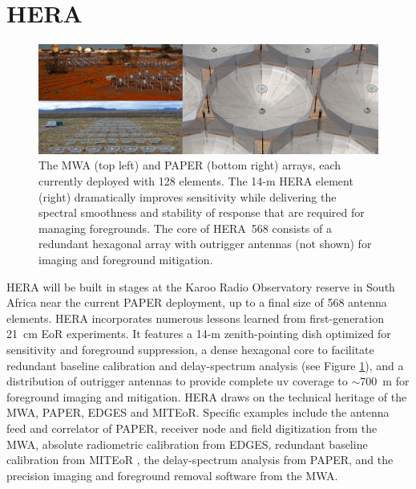 \documentclass[preprint]{aastex}
\begin{document}
\vspace{-0.25in}
\section{HERA}
\label{PDsec}
\begin{figure}[t]\centering
\includegraphics[width=6.5in]{plots/PAPER_and_MWA_and_HERA.jpg}
\caption{\small
The MWA (top left) and PAPER (bottom right) arrays, each currently deployed with 128 elements.
The 14-m HERA element (right) dramatically improves sensitivity
while delivering the spectral smoothness and stability of response that
are required for managing foregrounds.
The core of HERA~568 consists of a redundant hexagonal array with
outrigger antennas (not shown) for imaging and foreground mitigation.
}
\label{HERAfig}
\end{figure}

HERA will be built in stages at the Karoo Radio Observatory reserve in South Africa near the
current PAPER deployment, up to a final size of 568 antenna elements.
HERA 
incorporates numerous lessons learned from first-generation 21~cm EoR experiments.
It features a 14-m zenith-pointing dish optimized for sensitivity and foreground suppression,
a dense hexagonal core to facilitate redundant baseline calibration and
delay-spectrum analysis (see Figure \ref{HERAfig}), and a distribution of outrigger antennas to provide
complete uv coverage to $\sim$700~m for foreground imaging and mitigation.
HERA draws on the technical heritage of the MWA, PAPER,
EDGES and MITEoR. Specific examples include the antenna feed and correlator of
PAPER, receiver node and field digitization from the MWA, absolute radiometric
calibration from EDGES, redundant baseline calibration from MITEoR \citep{zheng_et_al2013_trunc}, the
delay-spectrum analysis from PAPER, and the precision imaging and foreground
removal software from the MWA.

\end{document}
